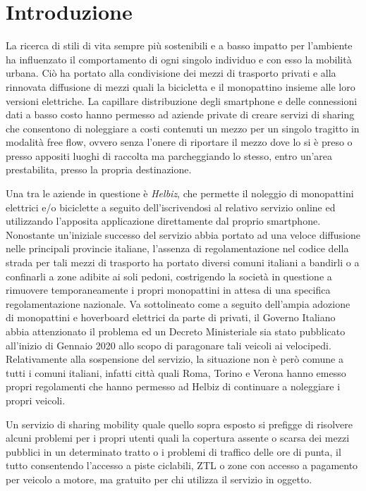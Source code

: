 \chapter{Introduzione}

La ricerca di stili di vita sempre più sostenibili e a basso impatto per
l'ambiente ha influenzato il comportamento di ogni singolo individuo e con esso
la mobilità urbana.
Ciò ha portato alla condivisione dei mezzi di trasporto privati e alla rinnovata
diffusione di mezzi quali la bicicletta e il monopattino insieme alle loro versioni
elettriche.
La capillare distribuzione degli smartphone e delle connessioni dati a basso costo
hanno permesso ad aziende private di creare servizi di sharing che consentono di 
noleggiare a costi contenuti un mezzo per un singolo tragitto in modalità free flow, ovvero
senza l'onere di riportare il mezzo dove lo si è preso o presso appositi luoghi
di raccolta ma parcheggiando lo stesso, entro un'area prestabilita, presso la
propria destinazione.

Una tra le aziende in questione è \emph{Helbiz}, che permette il noleggio di monopattini
elettrici e/o biciclette a seguito dell'iscrivendosi al relativo servizio online ed
utilizzando l'apposita applicazione direttamente dal proprio smartphone. Nonostante un'iniziale
successo del servizio abbia portato ad una veloce diffusione nelle principali provincie
italiane, l'assenza di regolamentazione nel codice della strada per tali mezzi di
trasporto ha portato diversi comuni italiani a bandirli o a confinarli a zone adibite
ai soli pedoni, costrigendo la società in questione a rimuovere temporaneamente i
propri monopattini in attesa di una specifica regolamentazione nazionale.
Va sottolineato come a seguito dell'ampia adozione di monopattini e hoverboard
elettrici da parte di privati, il Governo Italiano abbia attenzionato il problema
ed un Decreto Ministeriale sia stato pubblicato all'inizio di Gennaio 2020 allo
scopo di paragonare tali veicoli ai velocipedi.
Relativamente alla sospensione del servizio, la situazione non
è però comune a tutti i comuni italiani, infatti città quali Roma, Torino e Verona
hanno emesso propri regolamenti che hanno permesso ad Helbiz di continuare a
noleggiare i propri veicoli.

Un servizio di sharing mobility quale quello sopra esposto si prefigge di risolvere
alcuni problemi per i propri utenti quali la copertura assente o scarsa dei mezzi
pubblici in un determinato tratto o i problemi di traffico delle ore di punta, il tutto
consentendo l'accesso a piste ciclabili, ZTL o zone con accesso a pagamento per veicolo
a motore, ma gratuito per chi utilizza il servizio in oggetto.

